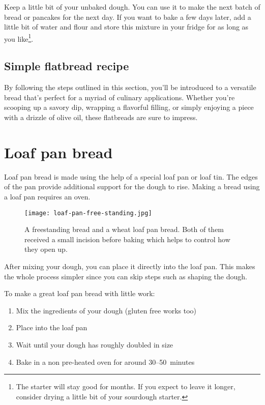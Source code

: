 Keep a little bit of your unbaked dough. You can use it to make the next
batch of bread or pancakes for the next day. If you want to bake a few days later, add
a little bit of water and flour and store this mixture in your fridge
for as long as you like\footnote{The starter will stay good for months. If you expect to
leave it longer, consider drying a little bit of your sourdough starter.}.

\subsection{Simple flatbread recipe}%
\label{subsec:flat-bread-recipe}

By following the steps outlined in this section,
you'll be introduced to a versatile bread that's perfect for a myriad of
culinary applications. Whether you're scooping up a savory dip,
wrapping a flavorful filling, or simply enjoying a piece with a drizzle
of olive oil, these flatbreads are sure to impress.



\section{Loaf pan bread}%
\label{sec:loaf-pan-bread}

Loaf pan bread is made using the help of a special loaf pan
or loaf tin. The edges of the pan provide additional support
for the dough to rise. Making a bread using a loaf pan requires
an oven.

\begin{figure}[!htb]
  \texttt{[image: loaf-pan-free-standing.jpg]}
  \caption[Freestanding bread and pan bread]{A freestanding bread and a wheat
      loaf pan bread. Both of them received a small incision before baking
      which helps to control how they open up.}%
  \label{fig:free-standing-loaf-pan}
\end{figure}

After mixing your dough, you can place it directly into the loaf pan.
This makes the whole process simpler since you can skip steps such
as shaping the dough.

To make a great loaf pan bread with little work:

\begin{enumerate}
    \item Mix the ingredients of your dough (gluten free works too)
    \item Place into the loaf pan
    \item Wait until your dough has roughly doubled in size
    \item Bake in a non pre-heated oven for around 30--50~minutes
\end{enumerate}


